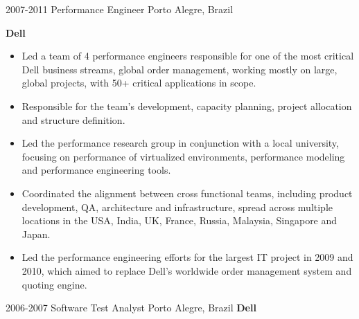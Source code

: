 \begin{entrylist}
{\begin{itemize}
      \end{itemize}
    }
  \entry
    {2007-2011}
    {Performance Engineer}
    {Porto Alegre, Brazil}
    {
      \textbf{Dell}
      \begin{itemize}
        \item Led a team of 4 performance engineers responsible for one of the most critical Dell business streams, global order management, working mostly on large, global projects, with 50+ critical applications in scope.
        \item Responsible for the team's development, capacity planning, project allocation and structure definition.
        \item Led the performance research group in conjunction with a local university, focusing on performance of virtualized environments, performance modeling and performance engineering tools.
        \item Coordinated the alignment between cross functional teams, including product development, QA, architecture and infrastructure, spread across multiple locations in the USA, India, UK, France, Russia, Malaysia, Singapore and Japan.
        \item Led the performance engineering efforts for the largest IT project in 2009 and 2010, which aimed to replace Dell's worldwide order management system and quoting engine.
      \end{itemize}
    }
  \entry
    {2006-2007}
    {Software Test Analyst}
    {Porto Alegre, Brazil}
    {
      \textbf{Dell}
      \newline
}
\end{entrylist}
